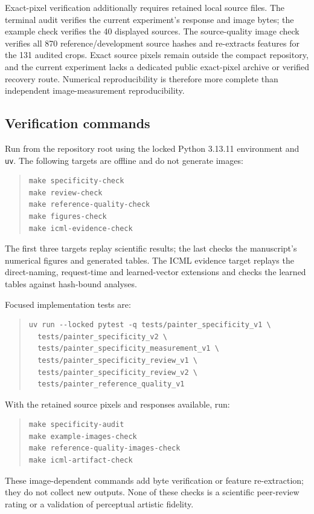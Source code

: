 Exact-pixel verification additionally requires retained local source files.
The terminal audit verifies the current experiment's response and image
bytes; the example check verifies the 40 displayed sources. The source-quality
image check verifies all 870 reference/development source hashes and
re-extracts features for the 131 audited crops. Exact source pixels remain
outside the compact repository, and the current experiment lacks a dedicated
public exact-pixel archive or verified recovery route. Numerical reproducibility
is therefore more complete than independent image-measurement reproducibility.

\subsection{Verification commands}
Run from the repository root using the locked Python 3.13.11 environment and
\texttt{uv}. The following targets are offline and do not generate images:
\begin{quote}\small
\begin{verbatim}
make specificity-check
make review-check
make reference-quality-check
make figures-check
make icml-evidence-check
\end{verbatim}
\end{quote}
The first three targets replay scientific results; the last checks the
manuscript's numerical figures and generated tables. The ICML evidence target
replays the direct-naming, request-time and learned-vector extensions and checks
the learned tables against hash-bound analyses.
\begin{samepage}
Focused implementation tests are:
\begin{quote}\small
\begin{verbatim}
uv run --locked pytest -q tests/painter_specificity_v1 \
  tests/painter_specificity_v2 \
  tests/painter_specificity_measurement_v1 \
  tests/painter_specificity_review_v1 \
  tests/painter_specificity_review_v2 \
  tests/painter_reference_quality_v1
\end{verbatim}
\end{quote}
\end{samepage}
With the retained source pixels and responses available, run:
\begin{quote}\small
\begin{verbatim}
make specificity-audit
make example-images-check
make reference-quality-images-check
make icml-artifact-check
\end{verbatim}
\end{quote}
These image-dependent commands add byte verification or feature re-extraction;
they do not collect new outputs. None of these checks is a scientific peer-review
rating or a validation of perceptual artistic fidelity.

